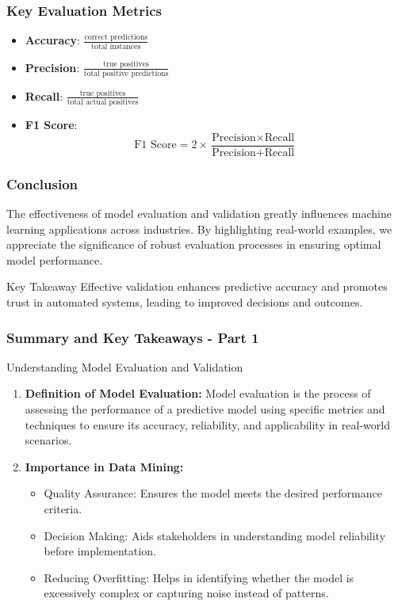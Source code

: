 \documentclass[aspectratio=169]{beamer}
\begin{document}
\begin{frame}[fragile]
    \frametitle{Key Evaluation Metrics}
    \begin{itemize}
        \item \textbf{Accuracy}: $\frac{\text{correct predictions}}{\text{total instances}}$
        \item \textbf{Precision}: $\frac{\text{true positives}}{\text{total positive predictions}}$
        \item \textbf{Recall}: $\frac{\text{true positives}}{\text{total actual positives}}$
        \item \textbf{F1 Score}:
        \begin{equation}
            \text{F1 Score} = 2 \times \frac{\text{Precision} \times \text{Recall}}{\text{Precision} + \text{Recall}}
        \end{equation}
    \end{itemize}
\end{frame}

\begin{frame}[fragile]
    \frametitle{Conclusion}
    The effectiveness of model evaluation and validation greatly influences machine learning applications across industries. By highlighting real-world examples, we appreciate the significance of robust evaluation processes in ensuring optimal model performance. 
    \begin{block}{Key Takeaway}
        Effective validation enhances predictive accuracy and promotes trust in automated systems, leading to improved decisions and outcomes.
    \end{block}
\end{frame}

\begin{frame}[fragile]
    \frametitle{Summary and Key Takeaways - Part 1}
    \begin{block}{Understanding Model Evaluation and Validation}
        \begin{enumerate}
            \item \textbf{Definition of Model Evaluation:} 
            Model evaluation is the process of assessing the performance of a predictive model using specific metrics and techniques to ensure its accuracy, reliability, and applicability in real-world scenarios.
            \item \textbf{Importance in Data Mining:}
            \begin{itemize}
                \item Quality Assurance: Ensures the model meets the desired performance criteria.
                \item Decision Making: Aids stakeholders in understanding model reliability before implementation.
                \item Reducing Overfitting: Helps in identifying whether the model is excessively complex or capturing noise instead of patterns.
            \end{itemize}
        \end{enumerate}
    \end{block}
\end{frame}
\end{document}
